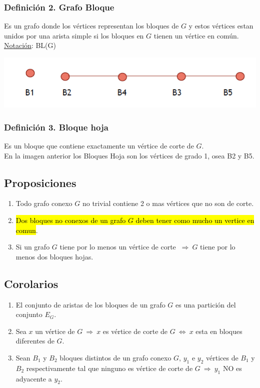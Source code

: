 \documentclass{article}
\newcommand{\Rightarrows}{\: \Rightarrow \:}            %
\newcommand{\Leftrightarrows}{\: \Leftrightarrow \:}    %
\begin{document}
\subsubsection*{Definición 2. Grafo Bloque}
Es un grafo  donde los vértices representan los bloques de $G$ y estos vértices estan unidos por una arista simple si los bloques en
$G$ tienen un vértice en común.
\\\underline{Notación}: BL(G)
\begin{center}
    \includegraphics[width=.50\textwidth]{grafoBloqueG.PNG}
\end{center}

\subsubsection*{Definición 3. Bloque hoja}
Es un bloque que contiene exactamente un vértice de corte de $G$.
\\En la imagen anterior los Bloques Hoja son los vértices de grado 1, osea B2 y B5.

\subsection{Proposiciones}
\begin{enumerate}
    \item Todo grafo conexo $G$ no trivial contiene 2 o mas vértices que no son de corte.
    \item \hl{Dos bloques no conexos de un grafo $G$ deben tener como mucho un vertice en comun}.
    \item Si un grafo $G$ tiene por lo menos un vértice de corte $\Rightarrows G$ tiene por lo menos dos bloques hojas.
\end{enumerate}

\subsection{Corolarios}
\begin{enumerate}
    \item El conjunto de aristas de los bloques de un grafo $G$ es una partición del
conjunto $E_G$.
    \item Sea $x$ un vértice de $G \Rightarrows x$ es vértice de corte de $G \Leftrightarrows x$ esta en bloques diferentes de $G$.
    \item  Sean $B_1$ y $B_2$ bloques distintos de un grafo conexo $G$, $y_1$ e $y_2$ vértices de
$B_1$ y $B_2$ respectivamente tal que ninguno es vértice de corte de $G \Rightarrows y_1$ NO es
adyacente a $y_2$.
\end{enumerate}
\end{document}
